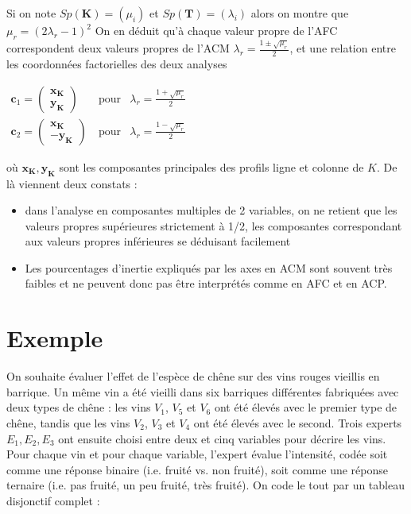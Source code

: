 \documentclass[letterpaper,10pt,french]{sphinxmanual}
\begin{document}
\sphinxAtStartPar
Si on note \(Sp(\mathbf{K}) = (\mu_i)\) et \(Sp(\mathbf{T}) = (\lambda_i)\) alors on montre  que  \(\mu_r = (2\lambda_r - 1)^2\)
On en déduit qu’à chaque valeur  propre de l’AFC correspondent deux valeurs propres de l’ACM \(\lambda_r = \frac{1\pm \sqrt{\mu_r}}{2}\), et une relation entre les coordonnées factorielles des deux analyses

\sphinxAtStartPar
\(\begin{eqnarray*}
\mathbf{c}_1 = \begin{pmatrix} \mathbf{x_K}\\\mathbf{y_K}\end{pmatrix}\ &\textrm{pour}& \lambda_r = \frac{1+ \sqrt{\mu_r}}{2}\\
\mathbf{c}_2 = \begin{pmatrix} \mathbf{x_K}\\-\mathbf{y_K}\end{pmatrix}\ &\textrm{pour}& \lambda_r = \frac{1- \sqrt{\mu_r}}{2}
\end{eqnarray*}\)

\sphinxAtStartPar
où \(\mathbf{x_K},\mathbf{y_K}\) sont les composantes principales des profils ligne et colonne de \(K\).
De là viennent deux constats :
\begin{itemize}
\item {} 
\sphinxAtStartPar
dans l’analyse en composantes multiples de 2 variables, on ne retient que les valeurs propres supérieures strictement à 1/2, les composantes correspondant  aux valeurs propres inférieures se déduisant facilement

\item {} 
\sphinxAtStartPar
Les pourcentages d’inertie expliqués par les axes en ACM sont souvent très faibles et
ne peuvent donc pas être interprétés comme en AFC et en ACP.

\end{itemize}


\section{Exemple}
\label{\detokenize{acm:exemple}}
\sphinxAtStartPar
On souhaite évaluer l’effet de l’espèce de chêne sur des vins rouges vieillis en barrique. Un même vin a été vieilli dans six barriques différentes fabriquées avec deux types de chêne : les vins \(V_1\), \(V_5\) et \(V_6\) ont été élevés avec le premier type de chêne, tandis que les vins \(V_2\), \(V_3\) et \(V_4\) ont été élevés avec le second. Trois experts \(E_1,E_2,E_3\) ont ensuite choisi entre deux et cinq variables pour décrire les vins. Pour chaque vin et pour chaque variable, l’expert évalue l’intensité, codée soit comme une réponse binaire (i.e. fruité vs. non fruité), soit comme une réponse ternaire (i.e. pas fruité, un peu fruité, très fruité). On code le tout par un tableau disjonctif complet :
\end{document}
